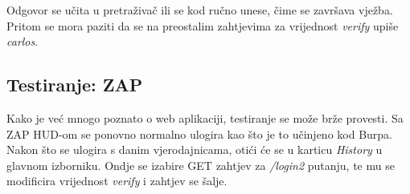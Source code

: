 Odgovor se učita u pretraživač ili se kod ručno unese, čime se završava vježba. Pritom se mora paziti da se na preostalim zahtjevima za vrijednost \textit{verify} upiše \textit{carlos}.\newpage %

\subsection{Testiranje: ZAP}
Kako je već mnogo poznato o web aplikaciji, testiranje se može brže provesti. Sa ZAP HUD-om se ponovno normalno ulogira kao što je to učinjeno kod Burpa. Nakon što se ulogira s danim vjerodajnicama, otići će se u karticu \textit{History} u glavnom izborniku. Ondje se izabire GET zahtjev za \textit{/login2} putanju, te mu se modificira vrijednost \textit{verify} i zahtjev se šalje.

